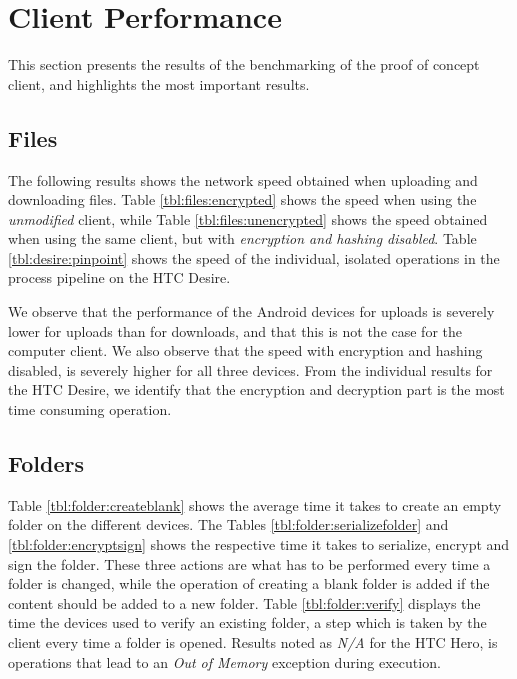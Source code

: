 \documentclass[pdftex,english,10pt,b5paper,twoside]{book}
\begin{document}
\section{Client Performance}

This section presents the results of the benchmarking of the proof of concept
client, and highlights the most important results.

\subsection{Files}

The following results shows the network speed obtained when uploading and
downloading files. Table \ref{tbl:files:encrypted} shows the speed when using
the \emph{unmodified} client, while Table \ref{tbl:files:unencrypted} shows the
speed obtained when using the same client, but with \emph{encryption and
hashing disabled}. Table \ref{tbl:desire:pinpoint} shows the speed of the
individual, isolated operations in the process pipeline on the HTC Desire.





We observe that the performance of the Android devices for uploads is severely
lower for uploads than for downloads, and that this is not the case for the
computer client. We also observe that the speed with encryption and hashing
disabled, is severely higher for all three devices. From the individual
results for the HTC Desire, we identify that the encryption and decryption
part is the most time consuming operation.

\subsection{Folders}

Table \ref{tbl:folder:createblank} shows the average time it takes to create an
empty folder on the different devices. The Tables
\ref{tbl:folder:serializefolder} and \ref{tbl:folder:encryptsign} shows the
respective time it takes to serialize, encrypt and sign the folder. These three
actions are what has to be performed every time a folder is changed, while the
operation of creating a blank folder is added if the content should be added to
a new folder. Table \ref{tbl:folder:verify} displays the time the devices used
to verify an existing folder, a step which is taken by the client every time a
folder is opened. Results noted as \emph{N/A} for the HTC Hero, is operations
that lead to an \emph{Out of Memory} exception during execution.
\end{document}
